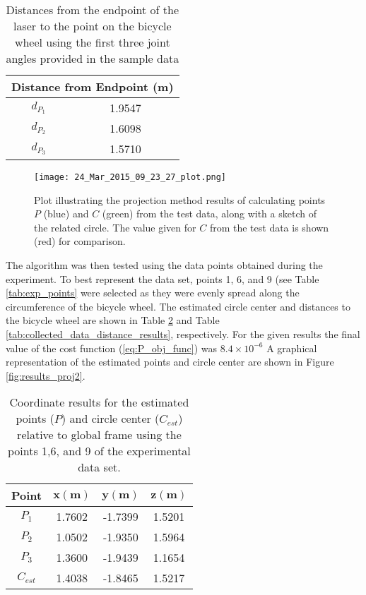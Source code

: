 \documentclass[12pt]{article}
\begin{document}
\begin{table}[ht!]
\begin{center}
\begin{tabular}{|c|c|}
\hline
\multicolumn{2}{|c|}{\textbf{Distance from Endpoint (m)}}  \\ \hline
$d_{P_1}$               & 1.9547  \\ \hline
$d_{P_2}$               & 1.6098  \\ \hline
$d_{P_3}$               & 1.5710  \\ \hline
\end{tabular}
\caption{Distances from the endpoint of the laser to the point on the bicycle wheel using the first three joint angles provided in the sample data}
\label{tab:test_data_distance_results}
\end{center}
\end{table}

\begin{figure}[!ht]
  {\texttt{[image: 24\_Mar\_2015\_09\_23\_27\_plot.png]}}
  \centering
  \caption{Plot illustrating the projection method results of calculating points $P$ (blue) and $C$ (green) from the test data, along with a sketch of the related circle. The value given for $C$ from the test data is shown (red) for comparison.}
  \centering
  \label{fig:results_proj1}
\end{figure}

The algorithm was then tested using the data points obtained during the experiment. To best represent the data set, points 1, 6, and 9 (see Table \ref{tab:exp_points} were selected as they were evenly spread along the circumference of the bicycle wheel. The estimated circle center and distances to the bicycle wheel are shown in Table \ref{tab:collected_data_point_results} and Table \ref{tab:collected_data_distance_results}, respectively.  For the given results the final value of the cost function (\ref{eq:P_obj_func}) was $8.4\times10^{-6}$ A graphical representation of the estimated points and circle center are shown in Figure \ref{fig:results_proj2}.

\begin{table}[ht!]
\begin{center}
\begin{tabular}{|c|c|c|c|}
\hline
\textbf{Point}  & $\boldsymbol{x (m)}$  & $\boldsymbol{y (m)}$ & $\boldsymbol{z (m)}$  \\ \hline
$P_1$  & 1.7602      & -1.7399     & 1.5201      \\ \hline
$P_2$  & 1.0502      & -1.9350     & 1.5964      \\ \hline
$P_3$  & 1.3600      & -1.9439     & 1.1654      \\ \hline
$C_{est}$    & 1.4038      & -1.8465     & 1.5217      \\ \hline
\end{tabular}
\caption{Coordinate results for the estimated points ($P$) and circle center ($C_{est}$) relative to global frame using the points 1,6, and 9 of the experimental data set.}
\label{tab:collected_data_point_results}
\end{center}
\end{table}
\end{document}

